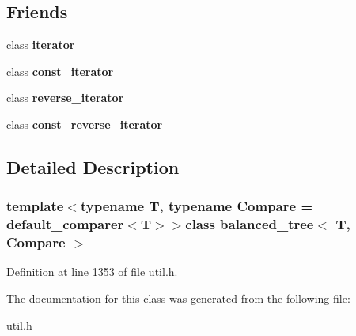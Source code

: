 \subsection*{Friends}
\begin{DoxyCompactItemize}
\item 
\hypertarget{classbalanced__tree_a67171474c4da6cc8efe0c7fafefd2b2d}{class {\bfseries iterator}}\label{classbalanced__tree_a67171474c4da6cc8efe0c7fafefd2b2d}

\item 
\hypertarget{classbalanced__tree_ac220ce1c155db1ac44146c12d178056f}{class {\bfseries const\+\_\+iterator}}\label{classbalanced__tree_ac220ce1c155db1ac44146c12d178056f}

\item 
\hypertarget{classbalanced__tree_af0a70641f2216cc31420487a62dd3b0d}{class {\bfseries reverse\+\_\+iterator}}\label{classbalanced__tree_af0a70641f2216cc31420487a62dd3b0d}

\item 
\hypertarget{classbalanced__tree_a776e261b45ef26d713a4d105a8d7c240}{class {\bfseries const\+\_\+reverse\+\_\+iterator}}\label{classbalanced__tree_a776e261b45ef26d713a4d105a8d7c240}

\end{DoxyCompactItemize}


\subsection{Detailed Description}
\subsubsection*{template$<$typename T, typename Compare = default\+\_\+comparer$<$\+T$>$$>$class balanced\+\_\+tree$<$ T, Compare $>$}



Definition at line 1353 of file util.\+h.



The documentation for this class was generated from the following file\+:\begin{DoxyCompactItemize}
\item 
util.\+h\end{DoxyCompactItemize}

